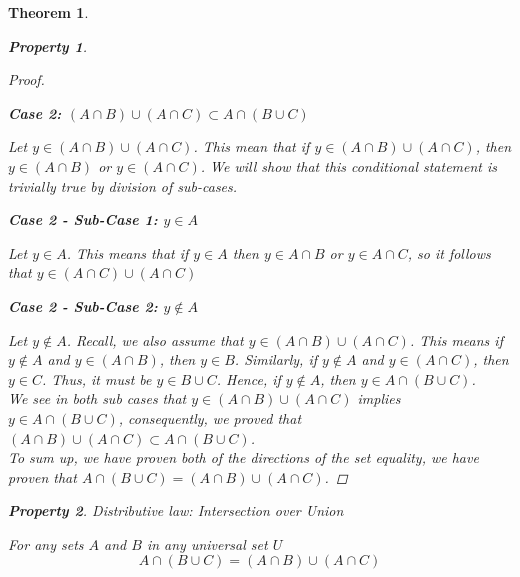 \documentclass{book}
\newtheorem{theorem}{Theorem}[section]
\newtheorem{property}{Property}[theorem]
\theoremstyle{definition}
\theoremstyle{remark}
\begin{document}
\begin{theorem}
\begin{property}
\begin{proof}
            \begin{flushleft} \textbf{Case 2: $(A \cap B) \cup (A \cap C) \subset A \cap (B \cup C)$} \end{flushleft} 
                Let $y \in (A \cap B) \cup (A \cap C)$. This mean that if $y \in (A \cap B) \cup (A \cap C)$, then $y \in (A \cap B)$ or $y \in (A \cap C)$. We will show that this conditional statement is trivially true by division of sub-cases. \\
                
                    \begin{flushleft} \textbf{Case 2 - Sub-Case 1: $y \in A$} \end{flushleft}
                        Let $y \in A$. This means that if $y \in A$ then $y \in A \cap B$ or $y \in A \cap C$, so it follows that $y \in (A \cap C) \cup (A \cap C)$ \\
                    
                    \begin{flushleft} \textbf{Case 2 - Sub-Case 2: $y \notin A$} \end{flushleft}  
                        Let $y \notin A$. Recall, we also assume that $y \in (A \cap B) \cup (A \cap C)$. This means if $y \notin A$ and $y \in (A \cap B)$, then $y \in B$. Similarly, if $y \notin A$ and $y \in (A \cap C)$, then $y \in C$. Thus, it must be $y \in B \cup C$. Hence, if $y \notin A$, then $y \in A \cap (B \cup C)$. \\
                
                We see in both sub cases that $y \in (A \cap B) \cup (A \cap C)$ implies $y \in A \cap (B \cup C)$, consequently, we proved that $(A \cap B) \cup (A \cap C) \subset A \cap (B \cup C)$. \\   
            To sum up, we have proven both of the directions of the set equality, we have proven that $A \cap (B \cup C) = (A \cap B) \cup (A \cap C)$. 
        \end{proof}
    \end{property}
    
    
    \newpage
    \begin{property}
    Distributive law: Intersection over Union \\
        \begin{tcolorbox}
            For any sets $A$ and $B$ in any universal set $U$
                \begin{equation*}
                    A \cap (B \cup C) = (A \cap B) \cup (A \cap C)
                \end{equation*}
        \end{tcolorbox}
    

\end{property}
\end{theorem}
\end{document}

